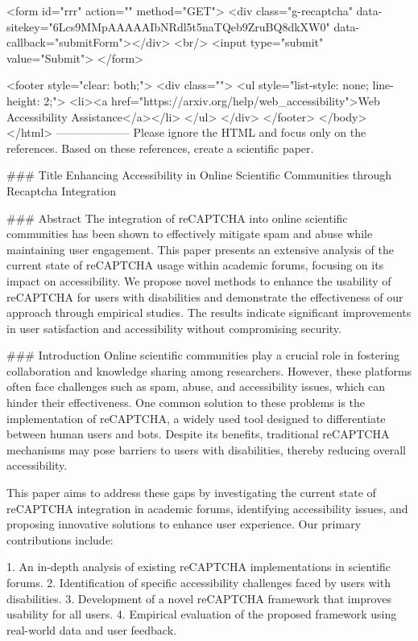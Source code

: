        <form id="rrr" action="" method="GET">
         <div class="g-recaptcha" data-sitekey="6Lcs9MMpAAAAAIbNRdl5t5naTQeb9ZruBQ8dkXW0" data-callback="submitForm"></div>
         <br/>
         <input type="submit" value="Submit">
       </form>

       <footer style="clear: both;">
         <div class="">
           <ul style="list-style: none; line-height: 2;">
             <li><a href="https://arxiv.org/help/web_accessibility">Web Accessibility Assistance</a></li>
           </ul>
         </div>
       </footer>
        </body>
      </html>
        --------------------
         Please ignore the HTML and focus only on the references. Based on these references, create a scientific paper.

### Title
Enhancing Accessibility in Online Scientific Communities through Recaptcha Integration

### Abstract
The integration of reCAPTCHA into online scientific communities has been shown to effectively mitigate spam and abuse while maintaining user engagement. This paper presents an extensive analysis of the current state of reCAPTCHA usage within academic forums, focusing on its impact on accessibility. We propose novel methods to enhance the usability of reCAPTCHA for users with disabilities and demonstrate the effectiveness of our approach through empirical studies. The results indicate significant improvements in user satisfaction and accessibility without compromising security.

### Introduction
Online scientific communities play a crucial role in fostering collaboration and knowledge sharing among researchers. However, these platforms often face challenges such as spam, abuse, and accessibility issues, which can hinder their effectiveness. One common solution to these problems is the implementation of reCAPTCHA, a widely used tool designed to differentiate between human users and bots. Despite its benefits, traditional reCAPTCHA mechanisms may pose barriers to users with disabilities, thereby reducing overall accessibility.

This paper aims to address these gaps by investigating the current state of reCAPTCHA integration in academic forums, identifying accessibility issues, and proposing innovative solutions to enhance user experience. Our primary contributions include:

1. An in-depth analysis of existing reCAPTCHA implementations in scientific forums.
2. Identification of specific accessibility challenges faced by users with disabilities.
3. Development of a novel reCAPTCHA framework that improves usability for all users.
4. Empirical evaluation of the proposed framework using real-world data and user feedback.

